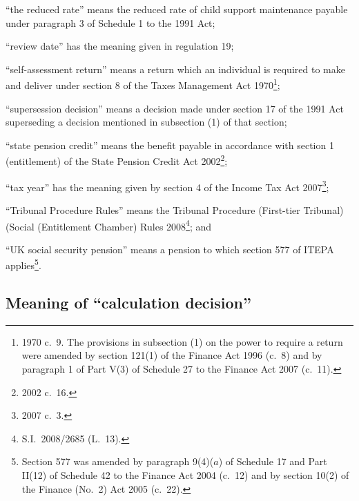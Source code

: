 \documentclass[12pt,a4paper]{article}
\begin{document}
\begin{enumerate}
“the reduced rate” means the reduced rate of child support maintenance payable under paragraph 3 of Schedule 1 to the 1991 Act;


“review date” has the meaning given in regulation 19;

“self-assessment return” means a return which an individual is required to make and deliver under section 8 of the Taxes Management Act 1970\footnote{1970 c.~9. The provisions in subsection (1) on the power to require a return were amended by section 121(1) of the Finance Act 1996 (c.~8) and by paragraph 1 of Part V(3) of Schedule 27 to the Finance Act 2007 (c.~11).};

“supersession decision” means a decision made under section 17 of the 1991 Act superseding a decision mentioned in subsection (1) of that section;

\pagebreak[3]

“state pension credit” means the benefit payable in accordance with section 1 (entitlement) of the State Pension Credit Act 2002\footnote{2002 c.~16.};

“tax year” has the meaning given by section 4 of the Income Tax Act 2007\footnote{2007 c.~3.};

“Tribunal Procedure Rules” means the Tribunal Procedure (First-tier Tribunal) (Social (Entitlement Chamber) Rules 2008\footnote{S.I.~2008/2685 (L.~13).}; and

“UK social security pension” means a pension to which section 577 of ITEPA applies\footnote{Section 577 was amended by paragraph 9(4)($a$)  of Schedule 17 and Part II(12) of Schedule 42 to the Finance Act 2004 (c.~12) and by section 10(2) of the Finance (No.~2) Act 2005 (c.~22).}.
\end{enumerate}


\subsection[3. Meaning of “calculation decision”]{Meaning of “calculation decision”}
\end{document}
